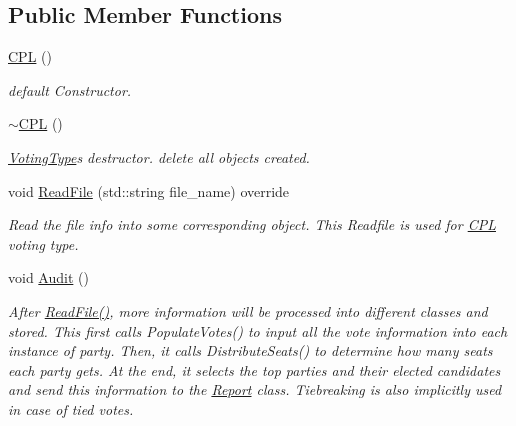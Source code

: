 \subsection*{Public Member Functions}
\begin{DoxyCompactItemize}
\item 
\mbox{\label{classCPL_a9938ffc19a8f041161df5e6392eb1d4c}} 
\hyperlink{classCPL_a9938ffc19a8f041161df5e6392eb1d4c}{C\+PL} ()
\begin{DoxyCompactList}\small\item\em default Constructor. \end{DoxyCompactList}\item 
\mbox{\label{classCPL_abbbcdafee9b1a5951730494fd3595439}} 
\hyperlink{classCPL_abbbcdafee9b1a5951730494fd3595439}{$\sim$\+C\+PL} ()
\begin{DoxyCompactList}\small\item\em \hyperlink{classVotingType}{Voting\+Type}\textquotesingle{}s destructor. {\ttfamily delete} all objects created. \end{DoxyCompactList}\item 
void \hyperlink{classCPL_a6da772d37fd8800873a4f8fbd7da4691}{Read\+File} (std\+::string file\+\_\+name) override
\begin{DoxyCompactList}\small\item\em Read the file info into some corresponding object. This Readfile is used for \hyperlink{classCPL}{C\+PL} voting type. \end{DoxyCompactList}\item 
\mbox{\label{classCPL_a8f3d28f6943cae5d9b349d66d9367781}} 
void \hyperlink{classCPL_a8f3d28f6943cae5d9b349d66d9367781}{Audit} ()
\begin{DoxyCompactList}\small\item\em After \hyperlink{classCPL_a6da772d37fd8800873a4f8fbd7da4691}{Read\+File()}, more information will be processed into different classes and stored. This first calls Populate\+Votes() to input all the vote information into each instance of party. Then, it calls Distribute\+Seats() to determine how many seats each party gets. At the end, it selects the top parties and their elected candidates and send this information to the \hyperlink{classReport}{Report} class. Tiebreaking is also implicitly used in case of tied votes. \end{DoxyCompactList}\end{DoxyCompactItemize}
